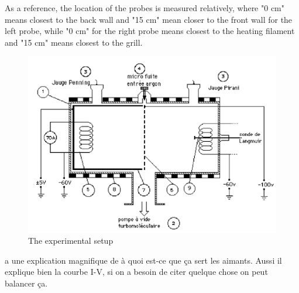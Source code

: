 As a reference, the location of the probes is measured relatively, where "0 cm" means closest to the back wall and "15 cm" mean closer to the front wall for the left probe, while "0 cm" for the right probe means closest to the heating filament and "15 cm" means closest to the grill.



\begin{figure}
    \centering
    \includegraphics[width=12cm]{figures/experimental-setup.png}
    \caption{The experimental setup}
    \label{fig:experimental_setup}
\end{figure}


\cite{merlino_understanding_2007} a une explication magnifique de à quoi est-ce que ça sert les aimants.
Aussi il explique bien la courbe I-V, si on a besoin de citer quelque chose on peut balancer ça.